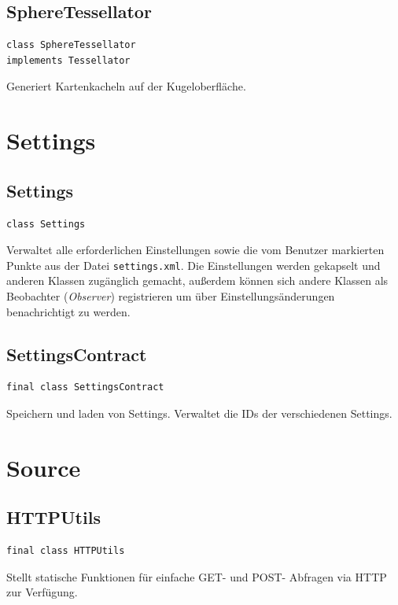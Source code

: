 \documentclass[10pt]{scrreprt}
\begin{document}
\vspace{5mm}
\subsection*{SphereTessellator}
\begin{lstlisting}
class SphereTessellator
implements Tessellator
\end{lstlisting}
Generiert Kartenkacheln auf der Kugeloberfläche.\\




\vspace{5mm}
\section{Settings}
\subsection*{Settings}
\begin{lstlisting}
class Settings
\end{lstlisting}
Verwaltet alle erforderlichen Einstellungen sowie die vom Benutzer markierten Punkte aus der Datei \texttt{settings.xml}. Die Einstellungen werden gekapselt und anderen Klassen zugänglich gemacht, außerdem können sich andere Klassen als Beobachter (\textit{Observer}) registrieren um über Einstellungsänderungen benachrichtigt zu werden.\\

\vspace{5mm}
\subsection*{SettingsContract}
\begin{lstlisting}
final class SettingsContract
\end{lstlisting}
Speichern und laden von Settings. Verwaltet die IDs der verschiedenen Settings.\\



\vspace{5mm}
\section{Source}
\subsection*{HTTPUtils}
\begin{lstlisting}
final class HTTPUtils
\end{lstlisting}
Stellt statische Funktionen für einfache GET- und POST- Abfragen via HTTP zur Verfügung.\\
\end{document}
